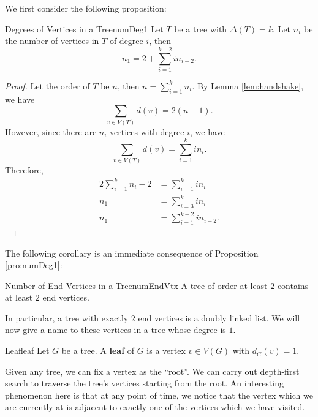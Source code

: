 \documentclass[math]{amznotes}
\theoremstyle{remark}
\begin{document}
We first consider the following proposition:
\begin{probox}{Degrees of Vertices in a Tree}{numDeg1}
    Let $T$ be a tree with $\Delta(T) = k$. Let $n_i$ be the number of vertices in $T$ of degree $i$, then
    \begin{equation*}
        n_1 = 2 + \sum_{i = 1}^{k - 2}in_{i + 2}.
    \end{equation*}
    \tcblower
    \begin{proof}
        Let the order of $T$ be $n$, then $n = \sum_{i = 1}^{k}n_i$. By Lemma \ref{lem:handshake}, we have
        \begin{equation*}
            \sum_{v \in V(T)}d(v) = 2(n - 1).
        \end{equation*}
        However, since there are $n_i$ vertices with degree $i$, we have
        \begin{equation*}
            \sum_{v \in V(T)}d(v) = \sum_{i = 1}^{k}in_i.
        \end{equation*}
        Therefore,
        \begin{align*}
            2\sum_{i = 1}^{k}n_i - 2 & = \sum_{i = 1}^{k}in_i \\
            n_1 & = \sum_{i = 3}^{k}in_i \\
            n_1 & = \sum_{i = 1}^{k - 2}in_{i + 2}.
        \end{align*}
    \end{proof}
\end{probox}
The following corollary is an immediate consequence of Proposition \ref{pro:numDeg1}:
\begin{corbox}{Number of End Vertices in a Tree}{numEndVtx}
    A tree of order at least $2$ contains at least $2$ end vertices.
\end{corbox}
In particular, a tree with exactly $2$ end vertices is a doubly linked list. We will now give a name to these vertices in a tree whose degree is $1$.
\begin{dfnbox}{Leaf}{leaf}
    Let $G$ be a tree. A {\color{red} \textbf{leaf}} of $G$ is a vertex $v \in V(G)$ with $d_G(v) = 1$.
\end{dfnbox}
Given any tree, we can fix a vertex as the ``root''. We can carry out depth-first search to traverse the tree's vertices starting from the root. An interesting phenomenon here is that at any point of time, we notice that the vertex which we are currently at is adjacent to exactly one of the vertices which we have visited.
\end{document}
